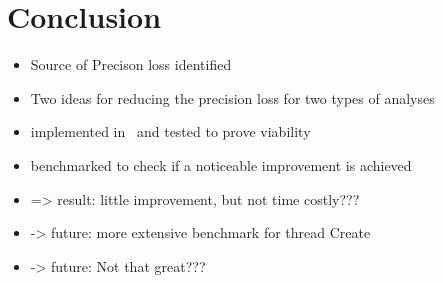 
\chapter{Conclusion}\label{chapter:conclusion}
\begin{itemize}
  \item Source of Precison loss identified
  \item Two ideas for reducing the precision loss for two types of analyses
  \item implemented in \gob\ and tested to prove viability
  \item benchmarked to check if a noticeable improvement is achieved
  \item => result: little improvement, but not time costly???
  \item -> future: more extensive benchmark for thread Create
  \item -> future: Not that great???
\end{itemize}

